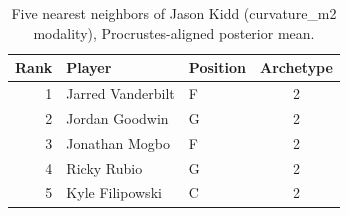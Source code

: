 \begin{table}[htbp]
  \centering\small
  \begin{tabular}{rllc}
    \toprule
    Rank & Player & Position & Archetype \\
    \midrule
    1 & Jarred Vanderbilt & F & 2 \\
    2 & Jordan Goodwin & G & 2 \\
    3 & Jonathan Mogbo & F & 2 \\
    4 & Ricky Rubio & G & 2 \\
    5 & Kyle Filipowski & C & 2 \\
    \bottomrule
  \end{tabular}
  \caption{Five nearest neighbors of Jason Kidd (curvature_m2 modality), Procrustes-aligned posterior mean.}
  \label{tab:Jason_Kidd_neighbors_curvature_m2}
\end{table}

